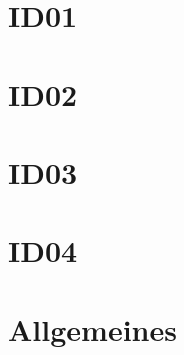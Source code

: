 \documentclass[a4paper,12pt]{article}
\begin{document}
\boldmath

\section*{ID01}


\newpage
\section*{ID02}


\newpage
\section*{ID03}


\newpage
\section*{ID04}


\newpage
\section*{Allgemeines}



\unboldmath
\end{document}
